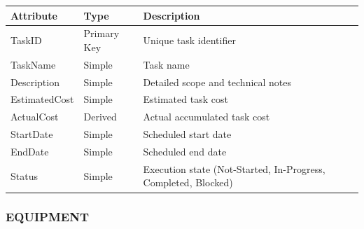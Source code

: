 \documentclass[a4paper,12pt]{report}
\newcounter{none} %
\begin{document}
{\def\LTcaptype{none} %
\begin{longtable}[]{@{}
  >{\raggedright\arraybackslash}p{}
  >{\raggedright\arraybackslash}p{}
  >{\raggedright\arraybackslash}p{}@{}}
\toprule\noalign{}
\begin{minipage}[b]{\linewidth}\raggedright
Attribute
\end{minipage} & \begin{minipage}[b]{\linewidth}\raggedright
Type
\end{minipage} & \begin{minipage}[b]{\linewidth}\raggedright
Description
\end{minipage} \\
\midrule\noalign{}
\endhead
\bottomrule\noalign{}
\endlastfoot
TaskID & Primary Key & Unique task identifier \\
TaskName & Simple & Task name \\
Description & Simple & Detailed scope and technical notes \\
EstimatedCost & Simple & Estimated task cost \\
ActualCost & Derived & Actual accumulated task cost \\
StartDate & Simple & Scheduled start date \\
EndDate & Simple & Scheduled end date \\
Status & Simple & Execution state (\allowbreak{}Not-Started, In-Progress, Completed, Blocked) \\
\end{longtable}
}

\subsubsection{EQUIPMENT}\label{equipment}
\end{document}

